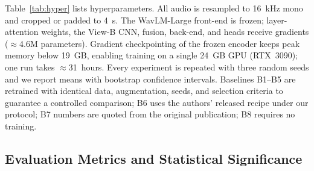 \begin{table}[t]
\centering
\caption{Training hyperparameters (selected on the ASVspoof~2019~LA dev set).}
\label{tab:hyper}
\footnotesize
\setlength{\tabcolsep}{5pt}
\end{table}

Table~\ref{tab:hyper} lists hyperparameters. All audio is resampled to 16~kHz mono and
cropped or padded to 4~s. The WavLM-Large front-end is frozen; layer-attention weights,
the View-B CNN, fusion, back-end, and heads receive gradients ($\approx$4.6M
parameters). Gradient checkpointing of the frozen encoder keeps peak memory below
19~GB, enabling training on a single 24~GB GPU (RTX~3090); one run takes
$\approx$31~hours. Every experiment is repeated with three random seeds and we report
means with bootstrap confidence intervals. Baselines B1--B5 are retrained with
identical data, augmentation, seeds, and selection criteria to guarantee a controlled
comparison; B6 uses the authors' released recipe under our protocol; B7 numbers are
quoted from the original publication; B8 requires no training.

\subsection{Evaluation Metrics and Statistical Significance}
\label{ssec:metrics}

